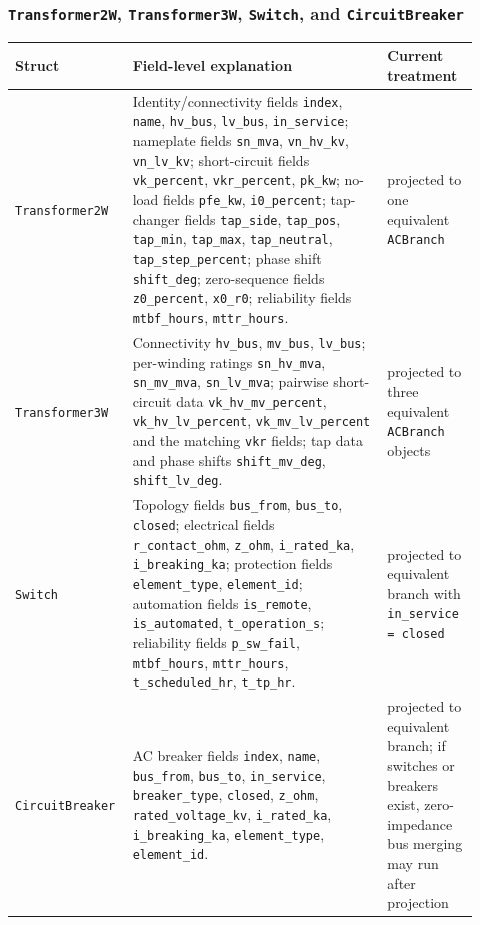 \subsubsection*{\texttt{Transformer2W}, \texttt{Transformer3W}, \texttt{Switch}, and \texttt{CircuitBreaker}}
\begin{longtable}{L{0.20\linewidth}L{0.53\linewidth}L{0.19\linewidth}}
\toprule
Struct & Field-level explanation & Current treatment \\
\midrule
\endhead
\texttt{Transformer2W} & Identity/connectivity fields \texttt{index}, \texttt{name}, \texttt{hv\_bus}, \texttt{lv\_bus}, \texttt{in\_service}; nameplate fields \texttt{sn\_mva}, \texttt{vn\_hv\_kv}, \texttt{vn\_lv\_kv}; short-circuit fields \texttt{vk\_percent}, \texttt{vkr\_percent}, \texttt{pk\_kw}; no-load fields \texttt{pfe\_kw}, \texttt{i0\_percent}; tap-changer fields \texttt{tap\_side}, \texttt{tap\_pos}, \texttt{tap\_min}, \texttt{tap\_max}, \texttt{tap\_neutral}, \texttt{tap\_step\_percent}; phase shift \texttt{shift\_deg}; zero-sequence fields \texttt{z0\_percent}, \texttt{x0\_r0}; reliability fields \texttt{mtbf\_hours}, \texttt{mttr\_hours}. & projected to one equivalent \texttt{ACBranch} \\
\texttt{Transformer3W} & Connectivity \texttt{hv\_bus}, \texttt{mv\_bus}, \texttt{lv\_bus}; per-winding ratings \texttt{sn\_hv\_mva}, \texttt{sn\_mv\_mva}, \texttt{sn\_lv\_mva}; pairwise short-circuit data \texttt{vk\_hv\_mv\_percent}, \texttt{vk\_hv\_lv\_percent}, \texttt{vk\_mv\_lv\_percent} and the matching \texttt{vkr} fields; tap data and phase shifts \texttt{shift\_mv\_deg}, \texttt{shift\_lv\_deg}. & projected to three equivalent \texttt{ACBranch} objects \\
\texttt{Switch} & Topology fields \texttt{bus\_from}, \texttt{bus\_to}, \texttt{closed}; electrical fields \texttt{r\_contact\_ohm}, \texttt{z\_ohm}, \texttt{i\_rated\_ka}, \texttt{i\_breaking\_ka}; protection fields \texttt{element\_type}, \texttt{element\_id}; automation fields \texttt{is\_remote}, \texttt{is\_automated}, \texttt{t\_operation\_s}; reliability fields \texttt{p\_sw\_fail}, \texttt{mtbf\_hours}, \texttt{mttr\_hours}, \texttt{t\_scheduled\_hr}, \texttt{t\_tp\_hr}. & projected to equivalent branch with \texttt{in\_service = closed} \\
\texttt{CircuitBreaker} & AC breaker fields \texttt{index}, \texttt{name}, \texttt{bus\_from}, \texttt{bus\_to}, \texttt{in\_service}, \texttt{breaker\_type}, \texttt{closed}, \texttt{z\_ohm}, \texttt{rated\_voltage\_kv}, \texttt{i\_rated\_ka}, \texttt{i\_breaking\_ka}, \texttt{element\_type}, \texttt{element\_id}. & projected to equivalent branch; if switches or breakers exist, zero-impedance bus merging may run after projection \\
\bottomrule
\end{longtable}

